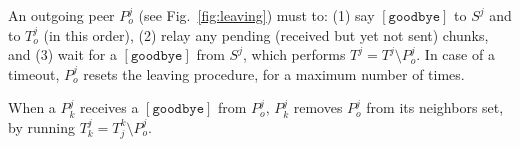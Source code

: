 \begin{figure*}
  \caption{Peer leaving.\label{fig:leaving}}
\end{figure*}
An outgoing peer $P^j_o$ (see Fig.~\ref{fig:leaving}) must to: (1) say
$[\mathtt{goodbye}]$ to $S^j$ and to $T^j_o$ (in this order), (2)
relay any pending (received but yet not sent) chunks, and (3) wait for
a $[\mathtt{goodbye}]$ from $S^j$, which performs $T^j = T^j \setminus
P^j_o$. In case of a timeout, $P^j_o$ resets the leaving procedure,
for a maximum number of times.

When a $P^j_k$ receives a $[\mathtt{goodbye}]$ from $P^j_o$, $P^j_k$
removes $P^j_o$ from its neighbors set, by running $T^j_k = T^k_j
\setminus P^j_o$.
